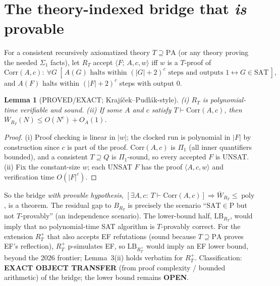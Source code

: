 \documentclass[11pt]{article}
\newtheorem{lemma}[theorem]{Lemma}
\newcommand{\poly}{\operatorname{poly}}
\newcommand{\SAT}{\mathrm{SAT}}
\newcommand{\Wb}{\overline W}
\begin{document}
\section{The theory-indexed bridge that \emph{is} provable}
For a consistent recursively axiomatized theory $T\supseteq\mathrm{PA}$
(or any theory proving the needed $\Sigma_1$ facts), let $R_T$ accept
$\langle F;\,A,c,w\rangle$ iff $w$ is a $T$-proof of
\[
\mathrm{Corr}(A,c):\ \forall G\ [\,A(G)\text{ halts within }(|G|+2)^c
\text{ steps and outputs }1\leftrightarrow G\in\SAT\,],
\]
and $A(F)$ halts within $(|F|+2)^c$ steps with output $0$.
\begin{lemma}[PROVED/EXACT; Krajíček--Pudlák-style]
(i) $R_T$ is polynomial-time verifiable and sound. (ii) If some $A$ and $c$
satisfy $T\vdash\mathrm{Corr}(A,c)$, then $\Wb_{R_T}(N)\le O(N^{c})+O_A(1)$.
\end{lemma}
\begin{proof}
(i) Proof checking is linear in $|w|$; the clocked run is polynomial in $|F|$
by construction since $c$ is part of the proof. $\mathrm{Corr}(A,c)$ is
$\Pi_1$ (all inner quantifiers bounded), and a consistent $T\supseteq Q$ is
$\Pi_1$-sound, so every accepted $F$ is UNSAT. (ii) Fix the constant-size
$w$; each UNSAT $F$ has the proof $\langle A,c,w\rangle$ and verification
time $O(|F|^c)$.
\end{proof}
So the bridge \emph{with provable hypothesis},
$[\exists A,c:\ T\vdash\mathrm{Corr}(A,c)]\Rightarrow\Wb_{R_T}\le\poly$, is a
theorem. The residual gap to $B_{R_T}$ is precisely the scenario
``$\SAT\in\mathrm P$ but not $T$-provably'' (an independence scenario). The
lower-bound half, $\mathrm{LB}_{R_T}$, would imply that no polynomial-time
SAT algorithm is $T$-provably correct. For the extension $R_T^{+}$ that also
accepts EF refutations (sound because $T\supseteq\mathrm{PA}$ proves EF's
reflection), $R_T^{+}$ p-simulates EF, so $\mathrm{LB}_{R_T^{+}}$ would imply
an EF lower bound, beyond the 2026 frontier; Lemma~3(ii) holds verbatim for
$R_T^{+}$. Classification: \textbf{EXACT OBJECT TRANSFER}
(from proof complexity / bounded arithmetic) of the bridge; the lower bound
remains \textbf{OPEN}.
\end{document}
